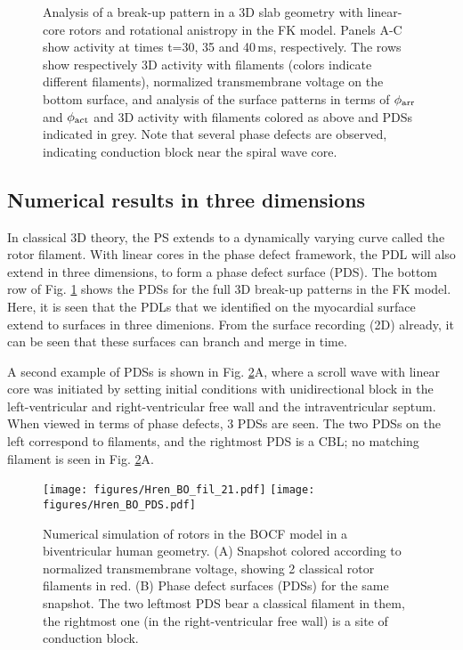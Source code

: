 \documentclass{article}
\newcommand{\phiact}{\ensuremath{\phi_{\rm act}}}
\newcommand{\phiarr}{\ensuremath{\phi_{\rm arr}}}
\newcommand{\figbreakup}{2.5cm}
\begin{document}
\begin{figure}
    \caption{Analysis of a break-up pattern in a 3D slab geometry with linear-core rotors and rotational anistropy in the FK model. Panels A-C show activity at times t=30, 35 and 40\,ms, respectively. The rows show respectively 3D activity with filaments (colors indicate different filaments),  normalized transmembrane voltage on the bottom surface, and analysis of the surface patterns in terms of $\phiarr$ and $\phiact$ and 3D activity with filaments colored as above and PDSs indicated in grey. Note that several phase defects are observed, indicating conduction block near the spiral wave core.}
    \label{fig:breakup}
\end{figure}

\subsection{Numerical results in three dimensions}

In classical 3D theory, the PS extends to a dynamically varying curve called the rotor filament. With linear cores in the phase defect framework, the PDL will also extend in three dimensions, to form a phase defect surface (PDS). The bottom row of Fig. \ref{fig:breakup} shows the PDSs for the full 3D break-up patterns in the FK model. Here, it is seen that the PDLs that we identified on the myocardial surface extend to surfaces in three dimenions. From the surface recording (2D) already, it can be seen that these surfaces can branch and merge in time. 

A second example of PDSs is shown in Fig. \ref{fig:3D}A, where a scroll wave with linear core was initiated by setting initial conditions with unidirectional block in the left-ventricular and right-ventricular free wall and the intraventricular septum. When viewed in terms of phase defects, 3 PDSs are seen. The two PDSs on the left correspond to filaments, and the rightmost PDS is a CBL; no matching filament is seen in Fig. \ref{fig:3D}A. 

\begin{figure}[b]
\centering
{} 
\texttt{[image: figures/Hren\_BO\_fil\_21.pdf]}
\texttt{[image: figures/Hren\_BO\_PDS.pdf]}
\caption{
Numerical simulation of rotors in the BOCF model in a biventricular human geometry. (A) Snapshot colored according to normalized transmembrane voltage, showing 2 classical rotor filaments in red. (B) Phase defect surfaces (PDSs) for the same snapshot. The two leftmost PDS bear a classical filament in them, the rightmost one (in the right-ventricular free wall) is a site of conduction block. 
\label{fig:3D} }
\end{figure}
\end{document}

